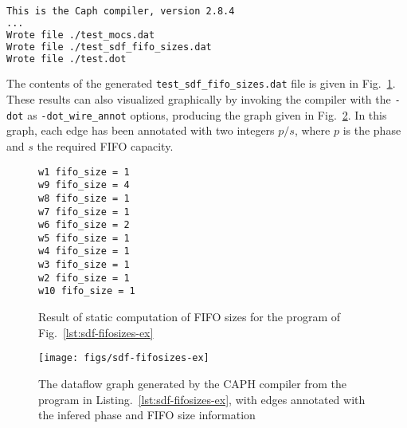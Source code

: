 \begin{lstlisting}[language=bash,basicstyle=\small]
This is the Caph compiler, version 2.8.4
...
Wrote file ./test_mocs.dat
Wrote file ./test_sdf_fifo_sizes.dat
Wrote file ./test.dot
\end{lstlisting}

The contents of the generated \verb|test_sdf_fifo_sizes.dat| file is given in
Fig.~\ref{fig:sdf-fifosizes-res}.  These results can also visualized graphically by invoking the
compiler with the \verb|-dot| as \verb|-dot_wire_annot| options, producing the graph given in
Fig.~\ref{fig:sdf-fifosizes-dfg}. In this graph, each edge has been annotated with two integers
$p/s$, where $p$ is the phase and $s$ the required FIFO capacity.

\begin{figure}[H]
  \centering
\begin{verbatim}
w1 fifo_size = 1
w9 fifo_size = 4
w8 fifo_size = 1
w7 fifo_size = 1
w6 fifo_size = 2
w5 fifo_size = 1
w4 fifo_size = 1
w3 fifo_size = 1
w2 fifo_size = 1
w10 fifo_size = 1
\end{verbatim}
  \caption{Result of static computation of FIFO sizes for the program of Fig.~\ref{lst:sdf-fifosizes-ex}}
  \label{fig:sdf-fifosizes-res}
\end{figure}

\begin{figure}[h]
  \centering
  \texttt{[image: figs/sdf-fifosizes-ex]}
  \caption{The dataflow graph generated by the CAPH compiler from the program in
    Listing.~\ref{lst:sdf-fifosizes-ex}, with edges annotated with the infered phase and FIFO size information}
  \label{fig:sdf-fifosizes-dfg}
\end{figure}
